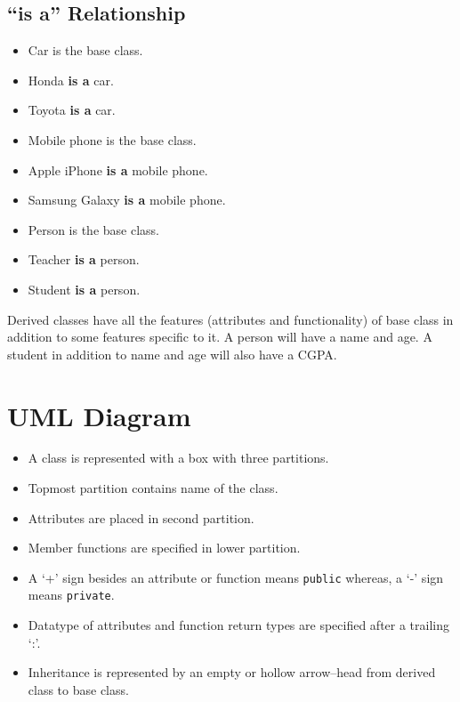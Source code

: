 \documentclass[12pt,a4paper]{article}
\begin{document}
\subsection{``is a'' Relationship}
\begin{itemize}
\item Car is the base class.
\item Honda \textbf{is a} car.
\item Toyota \textbf{is a} car.
\end{itemize}
\begin{itemize}
\item Mobile phone is the base class.
\item Apple iPhone \textbf{is a} mobile phone.
\item Samsung Galaxy \textbf{is a} mobile phone.
\end{itemize}
\begin{itemize}
\item Person is the base class.
\item Teacher \textbf{is a} person.
\item Student \textbf{is a} person.
\end{itemize}
Derived classes have all the features (attributes and functionality) of base class in addition to some features specific to it. A person will have a name and age. A student in addition to name and age will also have a CGPA.
\section{UML Diagram}
\begin{itemize}
\item A class is represented with a box with three partitions.
\item Topmost partition contains name of the class.
\item Attributes are placed in second partition.
\item Member functions are specified in lower partition.
\item A `+' sign besides an attribute or function means \verb|public| whereas, a `-' sign means \verb|private|.
\item Datatype of attributes and function return types are specified after a trailing `:'.
\item Inheritance is represented by an empty or hollow arrow--head from derived class to base class.
\end{itemize}
\nocite{*}


\end{document}

